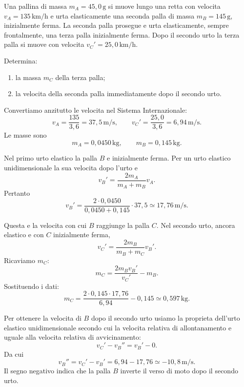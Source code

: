 
\begin{esercizio}
Una pallina di massa \(m_A=45{,}0\,\mathrm{g}\) si muove lungo una retta con
velocita \(v_A=135\,\mathrm{km/h}\) e urta elasticamente una seconda palla di
massa \(m_B=145\,\mathrm{g}\), inizialmente ferma. La seconda palla prosegue e
urta elasticamente, sempre frontalmente, una terza palla inizialmente ferma.
Dopo il secondo urto la terza palla si muove con velocita
\(v_C'=25{,}0\,\mathrm{km/h}\).

Determina:
\begin{enumerate}
\item la massa \(m_C\) della terza palla;
\item la velocita della seconda palla immediatamente dopo il secondo urto.
\end{enumerate}
\end{esercizio}

\begin{soluzione}
Convertiamo anzitutto le velocita nel Sistema Internazionale:
\[
v_A=\frac{135}{3{,}6}=37{,}5\,\mathrm{m/s},
\qquad
v_C'=\frac{25{,}0}{3{,}6}=6{,}94\,\mathrm{m/s}.
\]
Le masse sono
\[
m_A=0{,}0450\,\mathrm{kg},
\qquad
m_B=0{,}145\,\mathrm{kg}.
\]

Nel primo urto elastico la palla \(B\) e inizialmente ferma. Per un urto
elastico unidimensionale la sua velocita dopo l'urto e
\[
v_B'=\frac{2m_A}{m_A+m_B}v_A.
\]
Pertanto
\[
v_B'=\frac{2\cdot0{,}0450}{0{,}0450+0{,}145}\cdot37{,}5
\simeq17{,}76\,\mathrm{m/s}.
\]

Questa e la velocita con cui \(B\) raggiunge la palla \(C\). Nel secondo urto,
ancora elastico e con \(C\) inizialmente ferma,
\[
v_C'=\frac{2m_B}{m_B+m_C}v_B'.
\]
Ricaviamo \(m_C\):
\[
m_C=\frac{2m_Bv_B'}{v_C'}-m_B.
\]
Sostituendo i dati:
\[
m_C=\frac{2\cdot0{,}145\cdot17{,}76}{6{,}94}-0{,}145
\simeq0{,}597\,\mathrm{kg}.
\]

Per ottenere la velocita di \(B\) dopo il secondo urto usiamo la proprieta
dell'urto elastico unidimensionale secondo cui la velocita relativa di
allontanamento e uguale alla velocita relativa di avvicinamento:
\[
v_C'-v_B''=v_B'-0.
\]
Da cui
\[
v_B''=v_C'-v_B'=6{,}94-17{,}76
\simeq-10{,}8\,\mathrm{m/s}.
\]
Il segno negativo indica che la palla \(B\) inverte il verso di moto dopo il
secondo urto.
\end{soluzione}
